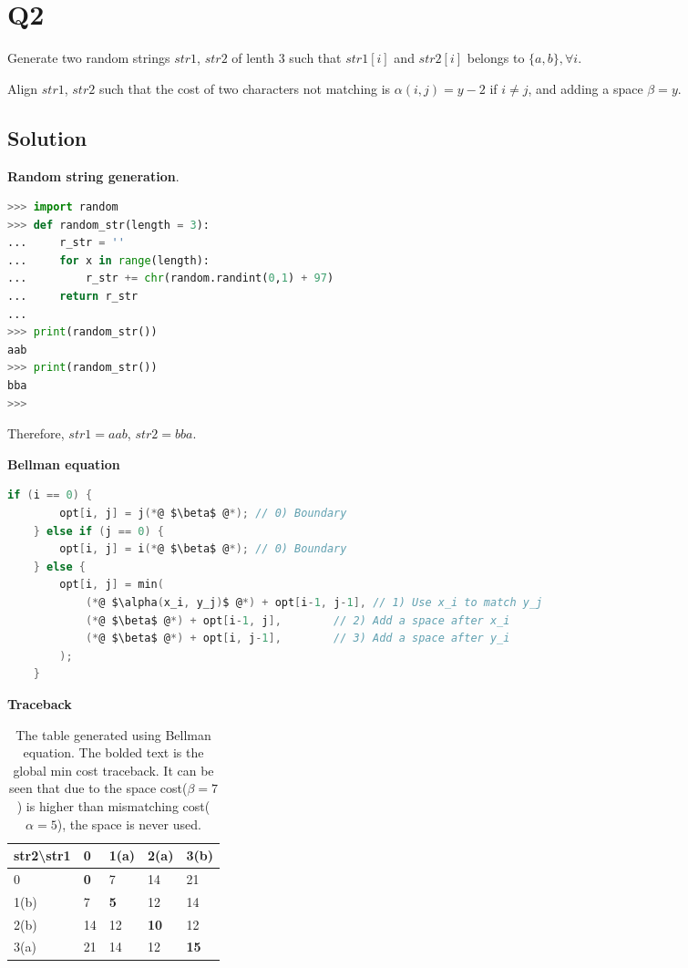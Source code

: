 
\section*{Q2}

Generate two random strings $str1$, $str2$ of lenth $3$ such that $str1[i]$ and $str2[i]$ belongs to $\{a,b\}, \forall i$.

Align $str1$, $str2$ such that the cost of two characters not matching is $\alpha(i,j)= y - 2$ if $i\neq j$, and adding a space $\beta=y$.

\subsection*{Solution}

\textbf{Random string generation}.
\begin{lstlisting}[language=python]
>>> import random
>>> def random_str(length = 3):
...     r_str = ''
...     for x in range(length):
...         r_str += chr(random.randint(0,1) + 97)
...     return r_str
...
>>> print(random_str())
aab
>>> print(random_str())
bba
>>>
\end{lstlisting}

Therefore, $str1 = aab$, $str2 = bba$.

\textbf{Bellman equation}

\begin{minipage}{\linewidth}
    \begin{lstlisting}[language=c]
    if (i == 0) {
        opt[i, j] = j(*@ $\beta$ @*); // 0) Boundary
    } else if (j == 0) {
        opt[i, j] = i(*@ $\beta$ @*); // 0) Boundary
    } else {
        opt[i, j] = min(
            (*@ $\alpha(x_i, y_j)$ @*) + opt[i-1, j-1], // 1) Use x_i to match y_j
            (*@ $\beta$ @*) + opt[i-1, j],        // 2) Add a space after x_i
            (*@ $\beta$ @*) + opt[i, j-1],        // 3) Add a space after y_i
        );
    }
    \end{lstlisting}
\end{minipage}

\textbf{Traceback}
\begin{table}[h!]
    \centering
    \begin{tabular}{|l|l|l|l|l|}
        \hline
        str2\textbackslash{}str1 & 0          & 1(a)       & 2(a)        & 3(b)        \\ \hline
        0                        & \textbf{0} & 7          & 14          & 21          \\ \hline
        1(b)                     & 7          & \textbf{5} & 12          & 14          \\ \hline
        2(b)                     & 14         & 12         & \textbf{10} & 12          \\ \hline
        3(a)                     & 21         & 14         & 12          & \textbf{15} \\ \hline
    \end{tabular}
    \caption{The table generated using Bellman equation. The bolded text is the global min cost traceback. It can be seen that due to the space cost($\beta = 7$) is higher than mismatching cost($\alpha = 5$), the space is never used.}
\end{table}

